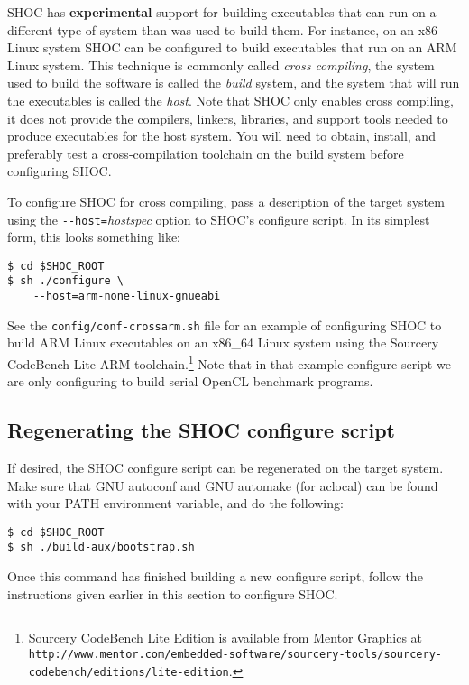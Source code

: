 \documentclass[11pt]{article}
\begin{document}
SHOC has {\bf experimental} support for building executables that can run on
a different type of system than was used to build them.
For instance, on an x86 Linux system SHOC can be configured to build 
executables that run on an ARM Linux system.
This technique is commonly called {\em cross compiling}, the system
used to build the software is called the {\em build} system, and the system
that will run the executables is called the {\em host}.
Note that SHOC only enables cross compiling, it does not provide
the compilers, linkers, libraries, and support tools needed to produce
executables for the host system.
You will need to obtain, install, and preferably test a cross-compilation
toolchain on the build system before configuring SHOC.

To configure SHOC for cross compiling, pass a description of the target
system using the \verb+--host=+{\em hostspec} option to SHOC's configure
script.
In its simplest form, this looks something like:
\begin{Verbatim}[frame=single]
$ cd $SHOC_ROOT
$ sh ./configure \
    --host=arm-none-linux-gnueabi
\end{Verbatim}
\noindent See the {\tt config/conf-crossarm.sh} file for an example of 
configuring SHOC to build ARM Linux executables on an x86\_64 Linux system
using the Sourcery CodeBench Lite ARM toolchain.\footnote{Sourcery CodeBench
Lite Edition is available from Mentor Graphics at 
{\tt http://www.mentor.com/embedded-software/sourcery-tools/sourcery-codebench/editions/lite-edition}.}
Note that in that example configure script we are only configuring to build
serial OpenCL benchmark programs.



\subsection{Regenerating the SHOC configure script}

If desired, the SHOC configure script can be regenerated on the target system.
Make sure that GNU autoconf and GNU automake (for aclocal) can be found with
your PATH environment variable, and do the following:

\begin{Verbatim}[frame=single]
$ cd $SHOC_ROOT
$ sh ./build-aux/bootstrap.sh
\end{Verbatim}

Once this command has finished building a new configure script, follow the
instructions given earlier in this section to configure SHOC.
\end{document}
